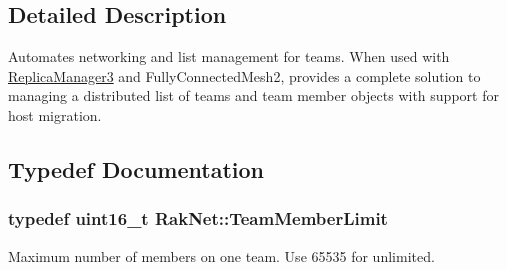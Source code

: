 \subsection{Detailed Description}
Automates networking and list management for teams. When used with \hyperlink{class_rak_net_1_1_replica_manager3}{Replica\-Manager3} and Fully\-Connected\-Mesh2, provides a complete solution to managing a distributed list of teams and team member objects with support for host migration. 

\subsection{Typedef Documentation}
\hypertarget{group___t_e_a_m___m_a_n_a_g_e_r___g_r_o_u_p_ga236290d3c5e0d6b3b4559ba851f02bed}{
\subsubsection[{Team\-Member\-Limit}]{\setlength{\rightskip}{0pt plus 5cm}typedef uint16\-\_\-t {\bf Rak\-Net\-::\-Team\-Member\-Limit}}}\label{group___t_e_a_m___m_a_n_a_g_e_r___g_r_o_u_p_ga236290d3c5e0d6b3b4559ba851f02bed}
Maximum number of members on one team. Use 65535 for unlimited. 

